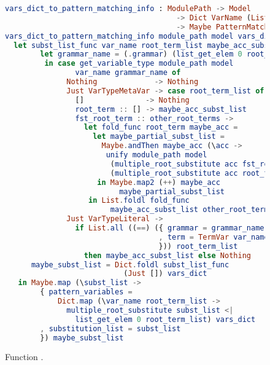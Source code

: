 \documentclass[master.tex]{subfiles}
\begin{document}
\begin{figure}[H]
\begin{framed}
\begin{lstlisting}[language=elm,basicstyle=\footnotesize\ttfamily]
vars_dict_to_pattern_matching_info : ModulePath -> Model
                                       -> Dict VarName (List RootTerm)
                                       -> Maybe PatternMatchingInfo
vars_dict_to_pattern_matching_info module_path model vars_dict =
  let subst_list_func var_name root_term_list maybe_acc_subst_list =
        let grammar_name = (.grammar) (list_get_elem 0 root_term_list)
         in case get_variable_type module_path model
                var_name grammar_name of
              Nothing             -> Nothing
              Just VarTypeMetaVar -> case root_term_list of
                []              -> Nothing
                root_term :: [] -> maybe_acc_subst_list
                fst_root_term :: other_root_terms ->
                  let fold_func root_term maybe_acc =
                    let maybe_partial_subst_list =
                      Maybe.andThen maybe_acc (\acc ->
                       unify module_path model
                        (multiple_root_substitute acc fst_root_term)
                        (multiple_root_substitute acc root_term))
                     in Maybe.map2 (++) maybe_acc
                          maybe_partial_subst_list
                   in List.foldl fold_func
                        maybe_acc_subst_list other_root_terms
              Just VarTypeLiteral ->
                if List.all ((==) ({ grammar = grammar_name
                                   , term = TermVar var_name
                                   })) root_term_list
                  then maybe_acc_subst_list else Nothing
      maybe_subst_list = Dict.foldl subst_list_func
                           (Just []) vars_dict
   in Maybe.map (\subst_list ->
        { pattern_variables =
            Dict.map (\var_name root_term_list ->
              multiple_root_substitute subst_list <|
                list_get_elem 0 root_term_list) vars_dict
        , substitution_list = subst_list
        }) maybe_subst_list
\end{lstlisting}
\end{framed}
\caption{Function .}
\label{fig:supp-vars-dict-to-pattern-matching-info}
\end{figure}
\end{document}
